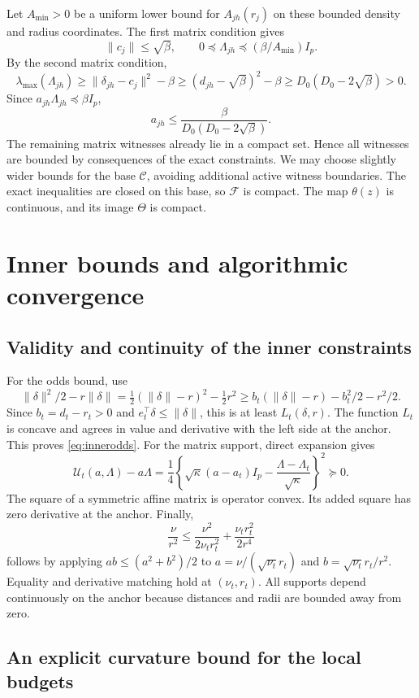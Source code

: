\documentclass[12pt,a4paper]{article}
\theoremstyle{remark}
\begin{document}
Let $A_{\min}>0$ be a uniform lower bound for $A_{jh}(r_j)$ on these bounded density and radius coordinates. The first matrix condition gives
\[
 \|c_j\|\le\sqrt\beta,\qquad
 0\preceq\Lambda_{jh}\preceq(\beta/A_{\min})I_p.
\]
By the second matrix condition,
\[
 \lambda_{\max}(\Lambda_{jh})
 \ge\|\delta_{jh}-c_j\|^2-\beta
 \ge(d_{jh}-\sqrt\beta)^2-\beta
 \ge D_0(D_0-2\sqrt\beta)>0.
\]
Since $a_{jh}\Lambda_{jh}\preceq\beta I_p$,
\[
 a_{jh}\le\frac{\beta}{D_0(D_0-2\sqrt\beta)}.
\]
The remaining matrix witnesses already lie in a compact set. Hence all witnesses are bounded by consequences of the exact constraints. We may choose slightly wider bounds for the base $\mathcal C$, avoiding additional active witness boundaries. The exact inequalities are closed on this base, so $\mathcal F$ is compact. The map $\theta(z)$ is continuous, and its image $\Theta$ is compact.

\section{Inner bounds and algorithmic convergence}\label{app:algorithm}

\subsection{Validity and continuity of the inner constraints}

For the odds bound, use
\[
 \|\delta\|^2/2-r\|\delta\|
       =\tfrac12(\|\delta\|-r)^2-\tfrac12r^2
       \ge b_t(\|\delta\|-r)-b_t^2/2-r^2/2.
\]
Since $b_t=d_t-r_t>0$ and $e_t^\top\delta\le\|\delta\|$, this is at least $L_t(\delta,r)$. The function $L_t$ is concave and agrees in value and derivative with the left side at the anchor. This proves \eqref{eq:innerodds}. For the matrix support, direct expansion gives
\[
 \mathcal U_t(a,\Lambda)-a\Lambda
  =\frac14\left\{\sqrt\kappa(a-a_t)I_p-
                 \frac{\Lambda-\Lambda_t}{\sqrt\kappa}\right\}^2\succeq0.
\]
The square of a symmetric affine matrix is operator convex. Its added square has zero derivative at the anchor. Finally,
\[
 \frac{\nu}{r^2}\le
 \frac{\nu^2}{2\nu_t r_t^2}
       +\frac{\nu_t r_t^2}{2r^4}
\]
follows by applying $ab\le(a^2+b^2)/2$ to
$a=\nu/(\sqrt{\nu_t}r_t)$ and
$b=\sqrt{\nu_t}r_t/r^2$. Equality and derivative matching hold at $(\nu_t,r_t)$. All supports depend continuously on the anchor because distances and radii are bounded away from zero.

\subsection{An explicit curvature bound for the local budgets}
\end{document}
